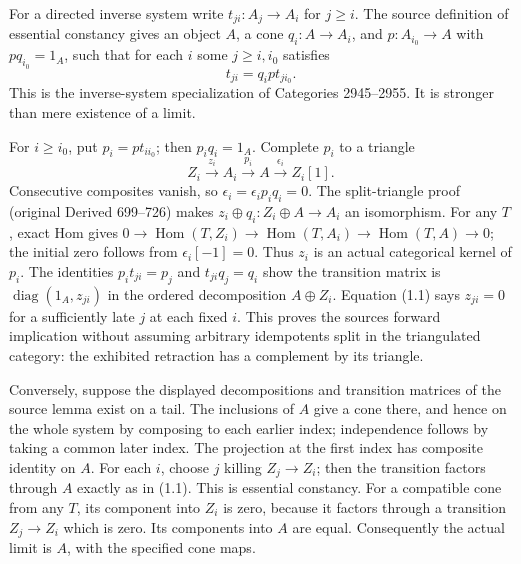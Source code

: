 \documentclass[11pt]{article}
\begin{document}
For a directed inverse system write \(t_{ji}:A_j\to A_i\) for \(j\geq i\). The source definition of essential constancy gives an object \(A\),\allowbreak{} a cone \(q_i:A\to A_i\),\allowbreak{} and \(p:A_{i_0}\to A\) with \(pq_{i_0}=1_A\),\allowbreak{} such that for each \(i\) some \(j\geq i,i_0\) satisfies \[
t_{ji}=q_i p t_{j i_0}. \tag{1.1}
\] This is the inverse-system specialization of Categories 2945–\allowbreak{}2955. It is stronger than mere existence of a limit.

For \(i\geq i_0\),\allowbreak{} put \(p_i=p t_{i i_0}\); then \(p_iq_i=1_A\). Complete \(p_i\) to a triangle \[
Z_i\xrightarrow{z_i}A_i\xrightarrow{p_i}A\xrightarrow{\epsilon_i}Z_i[1].
\] Consecutive composites vanish,\allowbreak{} so \(\epsilon_i=\epsilon_ip_iq_i=0\). The split-triangle proof (original Derived 699–\allowbreak{}726)\allowbreak{} makes \(z_i\oplus q_i:Z_i\oplus A\to A_i\) an isomorphism. For any \(T\),\allowbreak{} exact Hom gives \(0\to\operatorname{Hom}(T,Z_i)\to\operatorname{Hom}(T,A_i)
 \to\operatorname{Hom}(T,A)\to0\); the initial zero follows from \(\epsilon_i[-1]=0\). Thus \(z_i\) is an actual categorical kernel of \(p_i\). The identities \(p_i t_{ji}=p_j\) and \(t_{ji}q_j=q_i\) show the transition matrix is \(\operatorname{diag}(1_A,z_{ji})\) in the ordered decomposition \(A\oplus Z_i\). Equation (1.1)\allowbreak{} says \(z_{ji}=0\) for a sufficiently late \(j\) at each fixed \(i\). This proves the source\textquotesingle s forward implication without assuming arbitrary idempotents split in the triangulated category:\allowbreak{} the exhibited retraction has a complement by its triangle.

Conversely,\allowbreak{} suppose the displayed decompositions and transition matrices of the source lemma exist on a tail. The inclusions of \(A\) give a cone there,\allowbreak{} and hence on the whole system by composing to each earlier index; independence follows by taking a common later index. The projection at the first index has composite identity on \(A\). For each \(i\),\allowbreak{} choose \(j\) killing \(Z_j\to Z_i\); then the transition factors through \(A\) exactly as in (1.1)\allowbreak{}. This is essential constancy. For a compatible cone from any \(T\),\allowbreak{} its component into \(Z_i\) is zero,\allowbreak{} because it factors through a transition \(Z_j\to Z_i\) which is zero. Its components into \(A\) are equal. Consequently the actual limit is \(A\),\allowbreak{} with the specified cone maps.
\end{document}
